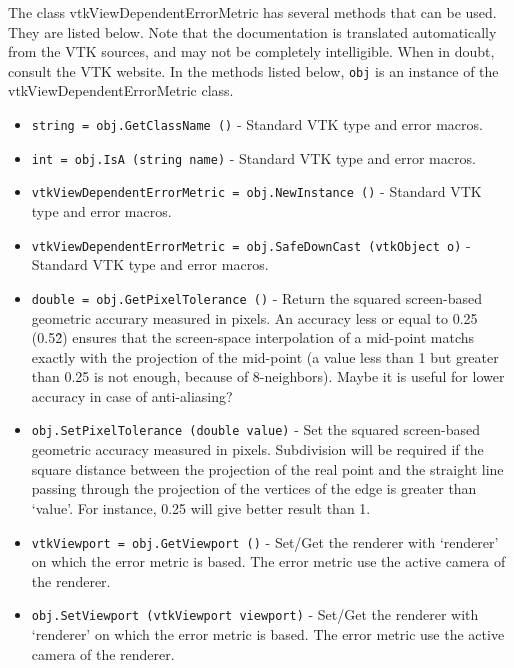 The class vtkViewDependentErrorMetric has several methods that can be used.
  They are listed below.
Note that the documentation is translated automatically from the VTK sources,
and may not be completely intelligible.  When in doubt, consult the VTK website.
In the methods listed below, \verb|obj| is an instance of the vtkViewDependentErrorMetric class.
\begin{itemize}
\item  \verb|string = obj.GetClassName ()| -  Standard VTK type and error macros.

\item  \verb|int = obj.IsA (string name)| -  Standard VTK type and error macros.

\item  \verb|vtkViewDependentErrorMetric = obj.NewInstance ()| -  Standard VTK type and error macros.

\item  \verb|vtkViewDependentErrorMetric = obj.SafeDownCast (vtkObject o)| -  Standard VTK type and error macros.

\item  \verb|double = obj.GetPixelTolerance ()| -  Return the squared screen-based geometric accurary measured in pixels.
 An accuracy less or equal to 0.25 (0.5\^2) ensures that the screen-space
 interpolation of a mid-point matchs exactly with the projection of the
 mid-point (a value less than 1 but greater than 0.25 is not enough,
 because of 8-neighbors). Maybe it is useful for lower accuracy in case of
 anti-aliasing?
 

\item  \verb|obj.SetPixelTolerance (double value)| -  Set the squared screen-based geometric accuracy measured in pixels.
 Subdivision will be required if the square distance between the projection
 of the real point and the straight line passing through the projection
 of the vertices of the edge is greater than `value'.
 For instance, 0.25 will give better result than 1.
 

\item  \verb|vtkViewport = obj.GetViewport ()| -  Set/Get the renderer with `renderer' on which the error metric 
 is based. The error metric use the active camera of the renderer.

\item  \verb|obj.SetViewport (vtkViewport viewport)| -  Set/Get the renderer with `renderer' on which the error metric 
 is based. The error metric use the active camera of the renderer.


\end{itemize}
